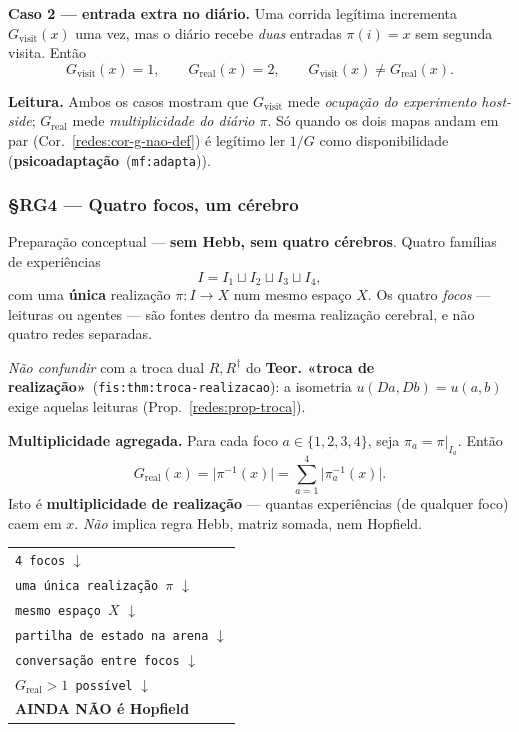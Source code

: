 \documentclass[11pt,a4paper]{article}
\newcommand{\code}[1]{\texttt{\small #1}}
\newcommand{\abs}[1]{\lvert #1\rvert}
\newcommand{\fis}[2]{\textbf{#2}~\textnormal{(\code{#1})}}
\newcommand{\mf}[2]{\textbf{#2}~\textnormal{(\code{mf:#1})}}
\begin{document}
\medskip\noindent\textbf{Caso 2 --- entrada extra no diário.} Uma corrida legítima
incrementa $G_{\mathrm{visit}}(x)$ uma vez, mas o diário recebe \emph{duas}
entradas $\pi(i)=x$ sem segunda visita. Então
\[
G_{\mathrm{visit}}(x)=1,\qquad G_{\mathrm{real}}(x)=2,\qquad
G_{\mathrm{visit}}(x)\neq G_{\mathrm{real}}(x).
\]

\medskip\noindent\textbf{Leitura.} Ambos os casos mostram que $G_{\mathrm{visit}}$ mede
\emph{ocupação do experimento host-side}; $G_{\mathrm{real}}$ mede
\emph{multiplicidade do diário $\pi$}. Só quando os dois mapas andam em par
(Cor.~\ref{redes:cor-g-nao-def}) é legítimo ler $1/G$ como disponibilidade
(\mf{adapta}{psicoadaptação}).

\subsubsection{§RG4 --- Quatro focos, um cérebro}\label{redes:rg4}

\noindent Preparação conceptual --- \textbf{sem Hebb, sem quatro cérebros}. Quatro
famílias de experiências
\[
I=I_1\sqcup I_2\sqcup I_3\sqcup I_4,
\]
com uma \textbf{única} realização $\pi\colon I\to X$ num mesmo espaço $X$.
Os quatro \emph{focos} --- leituras ou agentes --- são fontes dentro da mesma
realização cerebral, e não quatro redes separadas.

\emph{Não confundir} com a troca dual
$R,R^{\dagger}$ do \fis{fis:thm:troca-realizacao}{Teor. «troca de realização»}:
a isometria $u(Da,Db)=u(a,b)$ exige aquelas leituras
(Prop.~\ref{redes:prop-troca}).

\medskip\noindent\textbf{Multiplicidade agregada.} Para cada foco $a\in\{1,2,3,4\}$,
seja $\pi_a=\pi|_{I_a}$. Então
\[
G_{\mathrm{real}}(x)=\abs{\pi^{-1}(x)}
=\sum_{a=1}^{4}\abs{\pi_a^{-1}(x)}.
\]
Isto é \textbf{multiplicidade de realização} --- quantas experiências (de qualquer
foco) caem em $x$. \emph{Não} implica regra Hebb, matriz somada, nem Hopfield.

\begin{center}\small
\begin{tabular}{@{}l@{}}
\toprule
\code{4 focos} $\downarrow$ \\
\code{uma única realização $\pi$} $\downarrow$ \\
\code{mesmo espaço $X$} $\downarrow$ \\
\code{partilha de estado na arena} $\downarrow$ \\
\code{conversação entre focos} $\downarrow$ \\
\code{$G_{\mathrm{real}}>1$ possível} $\downarrow$ \\
\textbf{AINDA NÃO é Hopfield} \\
\bottomrule
\end{tabular}
\end{center}
\end{document}
